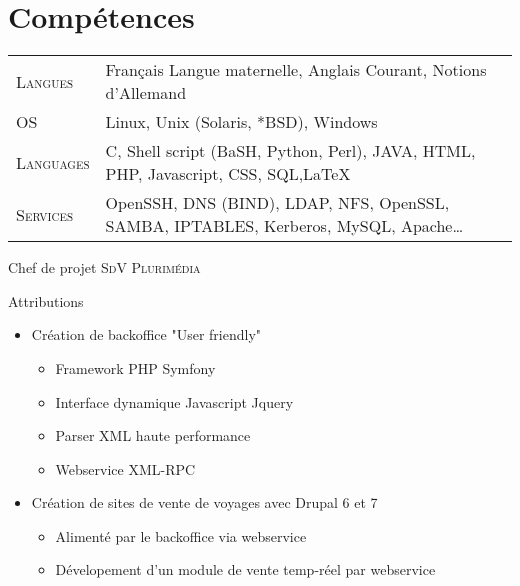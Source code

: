 \documentclass[a4paper,10pt]{article}
\begin{document}

\section{Compétences}
\begin{tabular}{p{}|p{}}	
\textsc{Langues} & Français Langue maternelle, Anglais Courant, Notions d'Allemand\\
\textsc{OS} & Linux, Unix (Solaris, *BSD), Windows\\
\textsc{Languages} & C, Shell script (BaSH, Python, Perl), JAVA, HTML, PHP, Javascript, CSS, SQL,\LaTeX\\
\textsc{Services} & OpenSSH, DNS (BIND), LDAP, NFS, OpenSSL, SAMBA, IPTABLES, Kerberos, MySQL, Apache\ldots
\end{tabular}

\newpage
\par{\centering\Large \hypertarget{sdv}{Chef de projet \textsc{SdV Plurimédia}}\par}\large{\centering Attributions\par}\normalsize

\begin{itemize}
	\item Création de backoffice "User friendly"
	\begin{itemize}
		\item Framework PHP Symfony
		\item Interface dynamique Javascript Jquery
		\item Parser XML haute performance
		\item Webservice XML-RPC
	\end{itemize}
	\item Création de sites de vente de voyages avec Drupal 6 et 7
	\begin{itemize}
		\item Alimenté par le backoffice via webservice
		\item Dévelopement d'un module de vente temp-réel par webservice
	\end{itemize}
\end{itemize}
\end{document}
